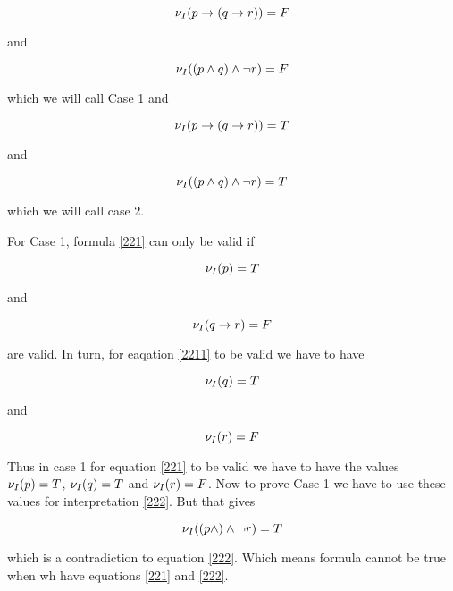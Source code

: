 \documentclass[10pt,a4paper]{article}
\begin{document}
\begin{equation}
\label{221}
 \nu_I(p \rightarrow ( q \rightarrow r )) = F
\end{equation}

and 

\begin{equation}
\label{222}
 \nu_I(( p \wedge q) \wedge \neg r ) = F
\end{equation}


which we will call Case 1 and

\begin{equation}
\label{223}
\nu_I(p \rightarrow ( q \rightarrow r )) = T
\end{equation}

and 

\begin{equation}
\label{224}
 \nu_I(( p \wedge q) \wedge \neg r ) = T
\end{equation}


which we will call case 2.

For Case 1, formula \ref{221} can only be valid if 

\begin{equation}
 \nu_I(p) = T
\end{equation}

and

\begin{equation}
\label{2211}
 \nu_I( q\rightarrow r ) = F
\end{equation}

are valid. In turn, for eaqation \ref{2211} to be valid we have to have 

\begin{equation}
 \nu_I(q) = T
\end{equation}

and

\begin{equation}
 \nu_I(r) = F
\end{equation}

Thus in case 1 for equation \ref{221} to be valid we have to have the values $\nu_I(p) = T$, $\nu_I(q) = T$ and $\nu_I(r) = F$.
Now to prove Case 1 we have to use these values for interpretation \ref{222}. But that gives

\begin{equation}
 \nu_I((p\wedge)\wedge \neg r) = T
\end{equation}

which is a contradiction to equation \ref{222}. Which means formula cannot be true when wh have equations \ref{221} and \ref{222}.
\end{document}
